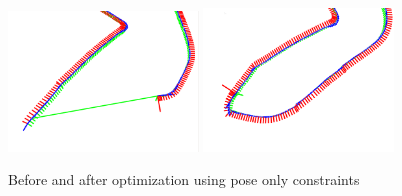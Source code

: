 \begin{figure}[h]
  \centering
    \includegraphics[width=0.45\textwidth]{chapters/images/before_opt_good}
    \includegraphics[width=0.45\textwidth]{chapters/images/after_opt_good}
  \caption{Before and after optimization using pose only constraints}
  \label{fig:graph_fail}
\end{figure}